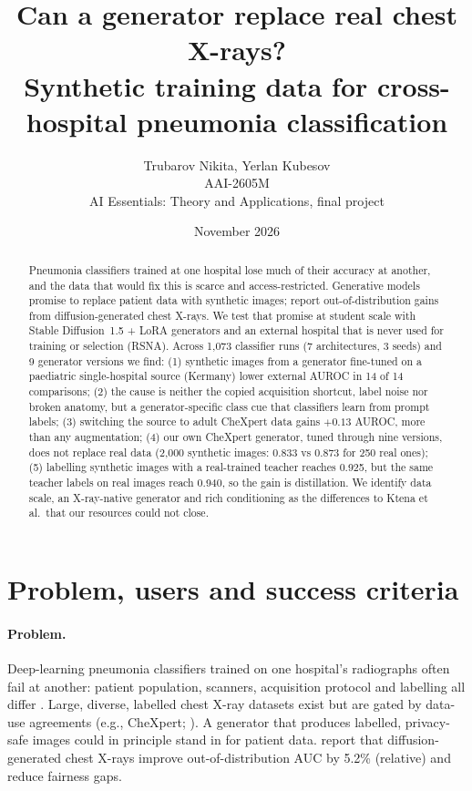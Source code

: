 \documentclass[11pt,a4paper]{article}
\title{Can a generator replace real chest X-rays?\\[4pt]
\large Synthetic training data for cross-hospital pneumonia classification}
\author{Trubarov Nikita, Yerlan Kubesov \\ AAI-2605M \\ AI Essentials: Theory and Applications, final project}
\date{November 2026}
\begin{document}
\maketitle

\begin{abstract}
Pneumonia classifiers trained at one hospital lose much of their accuracy at another, and the data that would fix this is scarce and access-restricted. Generative models promise to replace patient data with synthetic images; \citet{ktena2024} report out-of-distribution gains from diffusion-generated chest X-rays. We test that promise at student scale with Stable Diffusion~1.5 + LoRA generators and an external hospital that is never used for training or selection (RSNA). Across 1{,}073 classifier runs (7 architectures, 3 seeds) and 9 generator versions we find: (1) synthetic images from a generator fine-tuned on a paediatric single-hospital source (Kermany) lower external AUROC in 14 of 14 comparisons; (2) the cause is neither the copied acquisition shortcut, label noise nor broken anatomy, but a generator-specific class cue that classifiers learn from prompt labels; (3) switching the source to adult CheXpert data gains $+0.13$ AUROC, more than any augmentation; (4) our own CheXpert generator, tuned through nine versions, does not replace real data (2{,}000 synthetic images: 0.833 vs 0.873 for 250 real ones); (5) labelling synthetic images with a real-trained teacher reaches 0.925, but the same teacher labels on real images reach 0.940, so the gain is distillation. We identify data scale, an X-ray-native generator and rich conditioning as the differences to Ktena et al.\ that our resources could not close.
\end{abstract}

\section{Problem, users and success criteria}

\paragraph{Problem.} Deep-learning pneumonia classifiers trained on one hospital's radiographs often fail at another: patient population, scanners, acquisition protocol and labelling all differ \citep{zech2018,degrave2021}. Large, diverse, labelled chest X-ray datasets exist but are gated by data-use agreements (e.g., CheXpert; \citealp{irvin2019}). A generator that produces labelled, privacy-safe images could in principle stand in for patient data. \citet{ktena2024} report that diffusion-generated chest X-rays improve out-of-distribution AUC by 5.2\% (relative) and reduce fairness gaps.
\end{document}
